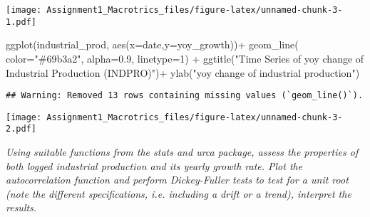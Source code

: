 \documentclass[
]{article}
\newenvironment{Shaded}{\begin{snugshade}}{\end{snugshade}}
\newcommand{\AttributeTok}[1]{\textcolor[rgb]{0.77,0.63,0.00}{#1}}
\newcommand{\CommentTok}[1]{\textcolor[rgb]{0.56,0.35,0.01}{\textit{#1}}}
\newcommand{\DecValTok}[1]{\textcolor[rgb]{0.00,0.00,0.81}{#1}}
\newcommand{\FloatTok}[1]{\textcolor[rgb]{0.00,0.00,0.81}{#1}}
\newcommand{\FunctionTok}[1]{\textcolor[rgb]{0.00,0.00,0.00}{#1}}
\newcommand{\NormalTok}[1]{#1}
\newcommand{\OtherTok}[1]{\textcolor[rgb]{0.56,0.35,0.01}{#1}}
\newcommand{\SpecialCharTok}[1]{\textcolor[rgb]{0.00,0.00,0.00}{#1}}
\newcommand{\StringTok}[1]{\textcolor[rgb]{0.31,0.60,0.02}{#1}}
\begin{document}
\texttt{[image: Assignment1\_Macrotrics\_files/figure-latex/unnamed-chunk-3-1.pdf]}

\begin{Shaded}
\begin{Highlighting}[]
\FunctionTok{ggplot}\NormalTok{(industrial\_prod, }\FunctionTok{aes}\NormalTok{(}\AttributeTok{x=}\NormalTok{date,}\AttributeTok{y=}\NormalTok{yoy\_growth))}\SpecialCharTok{+}
  \FunctionTok{geom\_line}\NormalTok{( }\AttributeTok{color=}\StringTok{"\#69b3a2"}\NormalTok{, }\AttributeTok{alpha=}\FloatTok{0.9}\NormalTok{, }\AttributeTok{linetype=}\DecValTok{1}\NormalTok{) }\SpecialCharTok{+}
  \FunctionTok{ggtitle}\NormalTok{(}\StringTok{"Time Series of yoy change of Industrial Production (INDPRO)"}\NormalTok{)}\SpecialCharTok{+}
  \FunctionTok{ylab}\NormalTok{(}\StringTok{"yoy change of industrial production"}\NormalTok{)}
\end{Highlighting}
\end{Shaded}

\begin{verbatim}
## Warning: Removed 13 rows containing missing values (`geom_line()`).
\end{verbatim}

\texttt{[image: Assignment1\_Macrotrics\_files/figure-latex/unnamed-chunk-3-2.pdf]}

\textit{Using suitable functions from the stats and urca package, assess the properties of both logged industrial production and its yearly growth rate. Plot the autocorrelation function and perform Dickey-Fuller tests to test for a unit root (note the different specifications, i.e. including a drift or a trend), interpret the results.}

\begin{Shaded}
\end{Shaded}
\end{document}
